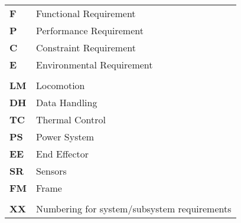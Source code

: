 \begin{tabular}{ll}
\textbf{F}	&	Functional Requirement	\\
\textbf{P}	&	Performance Requirement	\\
\textbf{C}	&	Constraint Requirement	\\
\textbf{E}	&	Environmental Requirement	\\
\\
\textbf{LM}	&	Locomotion		\\
\textbf{DH}	&	Data Handling	\\
\textbf{TC}	&	Thermal Control	\\
\textbf{PS}	&	Power System	\\
\textbf{EE}	&	End Effector	\\
\textbf{SR}	&	Sensors			\\
\textbf{FM}	&	Frame			\\
\\
\textbf{XX}	&	Numbering for system/subsystem requirements\\
\end{tabular}

\vspace*{\fill}


